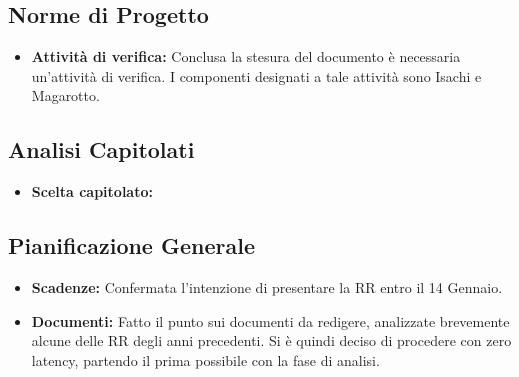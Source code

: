 \documentclass[a4paper, oneside, openany, dvipsnames, table]{article}
\begin{document}
\subsection{Norme di Progetto}
\begin{itemize}
\item \textbf{Attività di verifica:} Conclusa la stesura del documento è necessaria un'attività di verifica. I componenti designati a tale attività sono Isachi e Magarotto.
\end{itemize}
\subsection{Analisi Capitolati}
\begin{itemize}
\item \textbf{Scelta capitolato:} 
\end{itemize}

\subsection{Pianificazione Generale}
\begin{itemize}
\item \textbf{Scadenze:} Confermata l’intenzione di presentare la RR entro il 14 Gennaio.
\item \textbf{Documenti:} Fatto il punto sui documenti da redigere, analizzate brevemente alcune delle RR degli anni precedenti. Si è quindi deciso di procedere con zero latency, partendo il prima possibile con la fase di analisi.
\end{itemize}


\newpage
\end{document}
